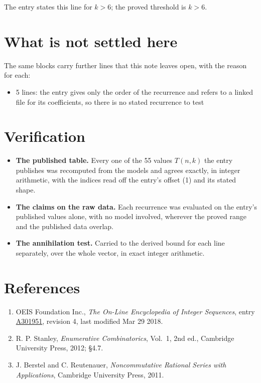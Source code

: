 \documentclass[11pt]{article}
\theoremstyle{definition}
\begin{document}
The entry states this line for $k > 6$; the proved threshold is $k > 6$.

\section{What is not settled here}

The same blocks carry further lines that this note leaves open, with the reason for each:

\begin{itemize}

\item 5 lines: the entry gives only the order of the recurrence and refers to a linked file for its coefficients, so there is no stated recurrence to test

\end{itemize}

\section{Verification}

\begin{itemize}

\item {\bfseries The published table.} Every one of the 55 values $T(n,k)$ the entry publishes was recomputed from the models and agrees exactly, in integer arithmetic, with the indices read off the entry's offset (1) and its stated shape.

\item {\bfseries The claims on the raw data.} Each recurrence was evaluated on the entry's published values alone, with no model involved, wherever the proved range and the published data overlap.

\item {\bfseries The annihilation test.} Carried to the derived bound for each line separately, over the whole vector, in exact integer arithmetic.

\end{itemize}

\section{References}

\begin{enumerate}

\item OEIS Foundation Inc., \emph{The On-Line Encyclopedia of Integer Sequences}, entry \href{https://oeis.org/A301951}{A301951}, revision 4, last modified Mar 29 2018.

\item R. P. Stanley, \emph{Enumerative Combinatorics}, Vol.~1, 2nd ed., Cambridge University Press, 2012; \S4.7.

\item J. Berstel and C. Reutenauer, \emph{Noncommutative Rational Series with Applications}, Cambridge University Press, 2011.

\end{enumerate}
\end{document}
